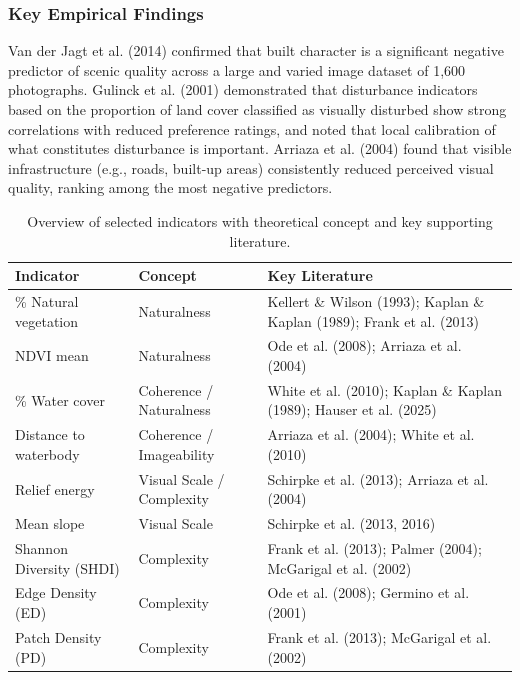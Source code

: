 \documentclass[hidelinks, 11pt]{article}
\begin{document}
\subsubsection{Key Empirical Findings}
Van der Jagt et al. (2014) confirmed that built character is a significant negative predictor of scenic quality across a large and varied image dataset of 1,600 photographs.
Gulinck et al. (2001) demonstrated that disturbance indicators based on the proportion of land cover classified as visually disturbed show strong correlations with reduced preference ratings, and noted that local calibration of what constitutes disturbance is important.
Arriaza et al. (2004) found that visible infrastructure (e.g., roads, built-up areas) consistently reduced perceived visual quality, ranking among the most negative predictors.

\begin{table}[ht]
\centering
\caption{Overview of selected indicators with theoretical concept and key supporting literature.}
\label{tab:indicators}
\begin{tabular}{lll}
\toprule
\textbf{Indicator} & \textbf{Concept} & \textbf{Key Literature} \\
\midrule
\% Natural vegetation    & Naturalness                 & Kellert \& Wilson (1993); Kaplan \& Kaplan (1989); Frank et al. (2013) \\
\addlinespace
NDVI mean                & Naturalness                 & Ode et al. (2008); Arriaza et al. (2004) \\
\addlinespace
\% Water cover           & Coherence / Naturalness     & White et al. (2010); Kaplan \& Kaplan (1989); Hauser et al. (2025) \\
\addlinespace
Distance to waterbody    & Coherence / Imageability    & Arriaza et al. (2004); White et al. (2010) \\
\addlinespace
Relief energy            & Visual Scale / Complexity   & Schirpke et al. (2013); Arriaza et al. (2004) \\
\addlinespace
Mean slope               & Visual Scale                & Schirpke et al. (2013, 2016) \\
\addlinespace
Shannon Diversity (SHDI) & Complexity                  & Frank et al. (2013); Palmer (2004); McGarigal et al. (2002) \\
\addlinespace
Edge Density (ED)        & Complexity                  & Ode et al. (2008); Germino et al. (2001) \\
\addlinespace
Patch Density (PD)       & Complexity                  & Frank et al. (2013); McGarigal et al. (2002) \\

\end{tabular}
\end{table}
\end{document}
